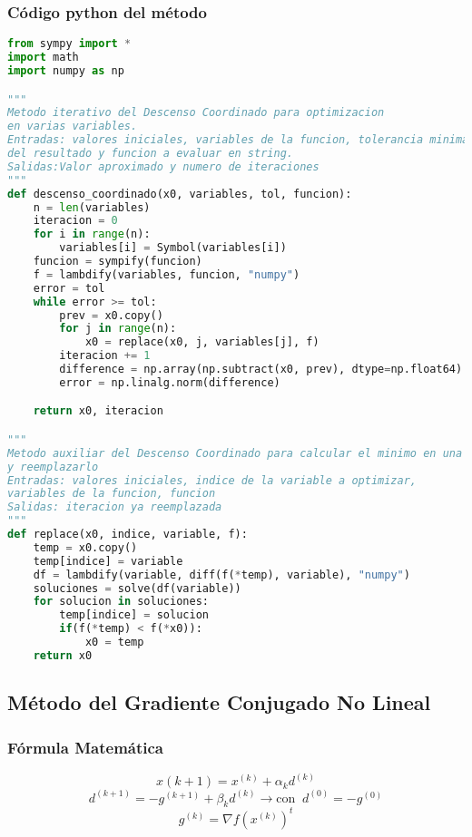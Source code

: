 \documentclass[12pt]{article}
\begin{document}
\subsubsection{Código python del método}
\begin{lstlisting}[language=Python, caption=Implementación del método del Descenso Coordinado en Python] 
from sympy import *
import math
import numpy as np

"""
Metodo iterativo del Descenso Coordinado para optimizacion
en varias variables.
Entradas: valores iniciales, variables de la funcion, tolerancia minima
del resultado y funcion a evaluar en string.
Salidas:Valor aproximado y numero de iteraciones
"""
def descenso_coordinado(x0, variables, tol, funcion):
    n = len(variables)
    iteracion = 0
    for i in range(n):
        variables[i] = Symbol(variables[i])
    funcion = sympify(funcion)
    f = lambdify(variables, funcion, "numpy")
    error = tol
    while error >= tol:
        prev = x0.copy()
        for j in range(n):
            x0 = replace(x0, j, variables[j], f)
        iteracion += 1
        difference = np.array(np.subtract(x0, prev), dtype=np.float64)
        error = np.linalg.norm(difference)

    return x0, iteracion

"""
Metodo auxiliar del Descenso Coordinado para calcular el minimo en una variable
y reemplazarlo
Entradas: valores iniciales, indice de la variable a optimizar,
variables de la funcion, funcion
Salidas: iteracion ya reemplazada
"""
def replace(x0, indice, variable, f):
    temp = x0.copy()
    temp[indice] = variable
    df = lambdify(variable, diff(f(*temp), variable), "numpy")
    soluciones = solve(df(variable))
    for solucion in soluciones:
        temp[indice] = solucion
        if(f(*temp) < f(*x0)):
            x0 = temp
    return x0
\end{lstlisting}


\subsection{Método del Gradiente Conjugado No Lineal}
\subsubsection{Fórmula Matemática}
\[x{(k+1)} = x^{(k)} + \alpha_{k} d^{(k)}\]
\vspace{1mm}
\[
       d^{(k+1)} = -g^{(k+1)} + \beta_{k}d^{(k)}\xrightarrow{}
       \text{con} \;\; d^{(0)} = -g^{(0)}
\]
\vspace{1mm}
\[g^{(k)} = \nabla{f(x^{(k)})}^t \]
\end{document}
